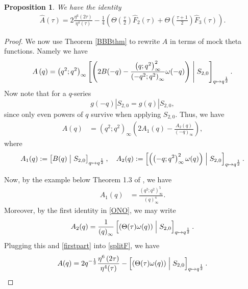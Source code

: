 \documentclass[12pt,reqno]{amsart}
\renewcommand{\o}{{\omega}}
\renewcommand{\t}{\tau}
\renewcommand{\(}{\left\(}
\renewcommand{\)}{\right\)}
\numberwithin{equation}{section}
\theoremstyle{plain}
\newtheorem{proposition}[theorem]{Proposition}
\theoremstyle{definition}
\numberwithin{equation}{section}
\begin{document}
\begin{proposition}\label{prop2}
We have the identity
\begin{align*}
\widehat{A}(\t)=2\frac{\eta^6(2\t)}{\eta^4(\t)}-\frac 14\left(\Theta\!\left(\frac{\t}{2}\right)\widehat{F}_2(\t)+\Theta\!\left(\frac{\t+1}{2}\right)\widehat{F}_3\left(\t\right)\right).
\end{align*}
\end{proposition}
\begin{proof} 
We now use Theorem \ref{BBBthm} to rewrite $A$ in terms of mock theta functions. Namely we have 
\[
A\left(q\right)=\left(q^2;q^2\right)_{\infty}\left[\left(2B(-q)-\frac{\left(q;q^2\right)^2_{\infty}}{\left(-q^2;q^2\right)_{\infty}}\o(-q)\right)\Biggm|S_{2,0}\right]_{q\mapsto q^{\frac 12}}.
\]
Now note that for a $q$-series
\[
g(-q)|S_{2,0}=g(q)|S_{2,0},
\]
since only even powers of $q$ survive when applying $S_{2,0}$. Thus, we have  
\begin{align}\label{splitF}
A(q)%
&=\left(q^2;q^2\right)_{\infty}\left(2A_1(q)-\frac{A_2(q)}{\left(-q\right)_{\infty}}\right),
\end{align}
where
\[
A_1(q):=\left[B(q)\bigm|S_{2,0}\right]_{q\mapsto q^{\frac 12}},\quad A_2(q):=\left[\left(\left(-q;q^2\right)^2_{\infty}\o(q)\right)\Bigm|S_{2,0}\right]_{q\mapsto q^{\frac 12}}.
\]

Now, by the example below Theorem 1.3 of \cite{BOR}, we have
\begin{align}\label{firstpart}
A_1(q)%
&=\frac{\left(q^2;q^2\right)^5_{\infty}}{\left(q\right)^4_{\infty}}.
\end{align}
Moreover, by the first identity in \eqref{ONO}, we may write 
\begin{equation*}%
A_2(q)=\frac{1}{\left(q\right)_{\infty}}\left[\left(\Theta(\t)\o(q)\right)\Bigm|S_{2,0}\right]_{q\mapsto q^{\frac 12}}.
\end{equation*}
Plugging this and \eqref{firstpart} into \eqref{splitF}, we have  
\begin{equation}\label{eqn1}
A(q)=2q^{-\frac 13}\frac{\eta^6\left(2\t\right)}{\eta^4(\t)}-\left[\left(\Theta(\t)\o(q)\right)\Bigm|S_{2,0}\right]_{q\mapsto q^{\frac 12}}.
\end{equation}


\end{proof}
\end{document}
